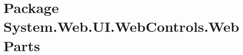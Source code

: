 \section{Package System.Web.UI.Web\-Controls.Web\-Parts}
\label{namespace_system_1_1_web_1_1_u_i_1_1_web_controls_1_1_web_parts}


